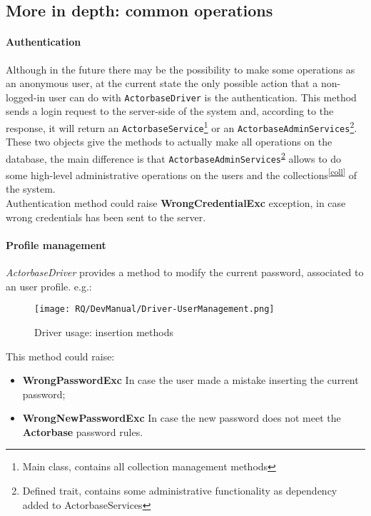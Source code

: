 \documentclass{scalatekids-article}
\begin{document}
\subsection{More in depth: common operations}

\paragraph{Authentication}

Although in the future there may be the possibility to make some
operations as an anonymous user, at the current state the only possible action
that a non-logged-in user can do with \verb=ActorbaseDriver= is the authentication.
This method sends a login request to the server-side of the system and, according
to the response, it will return an \verb=ActorbaseService=\footnote{Main class,
  contains all collection management methods\label{ActorbaseServices}} or an
\verb=ActorbaseAdminServices=\footnote{Defined trait, contains some
  administrative functionality as dependency added to
  ActorbaseServices\label{AdminServices}}. These two objects give the methods to
actually make all operations on the database, the main difference is that
\verb=ActorbaseAdminServices=\textsuperscript{\ref{AdminServices}} allows to do
some high-level administrative operations on the users and the
collections\textsuperscript{\ref{coll}} of the system.\\
Authentication method could raise \textbf{WrongCredentialExc} exception, in case
 wrong credentials has been sent to the server.

\paragraph{Profile management}

\textit{ActorbaseDriver} provides a method to modify the current password,
associated to an user profile.
e.g.:
 \begin{figure}[H]
   \begin{center}
     \texttt{[image: RQ/DevManual/Driver-UserManagement.png]}
     \caption{Driver usage: insertion methods}
   \end{center}
 \end{figure}
This method could raise:
\begin{itemize}
\item \textbf{WrongPasswordExc} In case the user made a mistake inserting the current password;
\item \textbf{WrongNewPasswordExc} In case the new password does not meet the \textbf{Actorbase} password rules.
\end{itemize}
\end{document}
